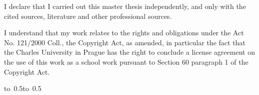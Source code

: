 \newpage
{}

\noindent
I declare that I carried out this master thesis independently, and only with the cited
sources, literature and other professional sources.

\medskip\noindent
I understand that my work relates to the rights and obligations under the Act No.
121/2000 Coll., the Copyright Act, as amended, in particular the fact that the Charles
University in Prague has the right to conclude a license agreement on the use of this
work as a school work pursuant to Section 60 paragraph 1 of the Copyright Act.

%

\vspace{18mm}

\hbox{\hbox to 0.5\hbox to 0.5}


\newpage

